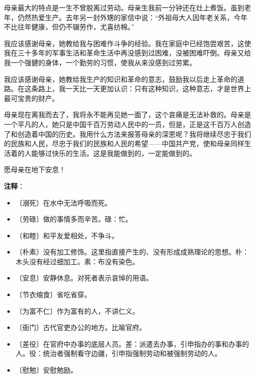 \documentclass[12pt,UTF-8,openany]{ctexbook}
\begin{document}
\begin{normalsize}
    母亲最大的特点是一生不曾脱离过劳动。母亲生我前一分钟还在灶上煮饭。虽到老年，仍然热爱生产。去年另一封外甥的家信中说：“外祖母大人因年老关系，今年不比往年健康，但仍不辍劳作，尤喜纺棉。”
    
    我应该感谢母亲，她教给我与困难作斗争的经验。我在家庭中已经饱尝艰苦，这使我在三十多年的军事生活和革命生活中再没感到过困难，没被困难吓倒。母亲又给我一个强健的身体，一个勤劳的习惯，使我从来没感到过劳累。
    
    我应该感谢母亲，她教给我生产的知识和革命的意志，鼓励我以后走上革命的道路。在这条路上，我一天比一天更加认识：只有这种知识，这种意志，才是世界上最可宝贵的财产。
    
    母亲现在离我而去了，我将永不能再见她一面了，这个哀痛是无法补救的。母亲是一个平凡的人，她只是中国千百万劳动人民中的一员，但是，正是这千百万人创造了和创造着中国的历史。我用什么方法来报答母亲的深恩呢？我将继续尽忠于我们的民族和人民，尽忠于我们的民族和人民的希望——中国共产党，使和母亲同样生活着的人能够过快乐的生活。这是我能做到的，一定能做到的。
    
    愿母亲在地下安息！
    
\end{normalsize}


\newpage

\textbf{注释}：

\vspace{-1em}

\begin{itemize}
    \setlength\itemsep{-0.2em}
    \item 〔溺死〕在水中无法呼吸而死。
    \item 〔劳碌〕做的事情多而辛苦。碌：忙。
    \item 〔和睦〕和平友爱相处，不争斗。
    \item 〔朴素〕没有加工修饰。这里指直接产生的、没有形成成熟理论的思想。朴：木头没有经过细加工。素：布没有染色。
    \item 〔安息〕安静休息。对死者表示哀悼的用语。
    \item 〔节衣缩食〕省吃省穿。
    \item 〔为富不仁〕作为富有的人，不讲仁义。
    \item 〔衙门〕古代官吏办公的地方。比喻官府。
    \item 〔差役〕在官府中办事的底层人员。差：派遣去办事，引申指办的事和办事的人。役：统治者强制看守边疆，引申指强制劳动和被强制劳动的人。
    \item 〔慰勉〕安慰勉励。
\end{itemize}
\end{document}
